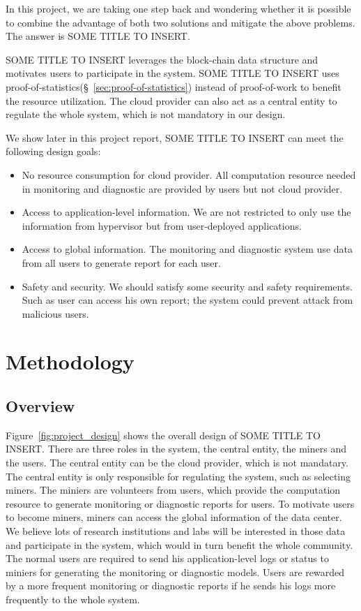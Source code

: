 \documentclass{article}
\newcommand{\projTitle}{SOME TITLE TO INSERT\xspace}
\begin{document}
In this project, we are taking one step back and wondering whether it is possible to combine the advantage of both two solutions and mitigate the above problems. The answer is \projTitle.

\projTitle leverages the block-chain data structure and motivates users to participate in the system. \projTitle uses proof-of-statistics(\S~\ref{sec:proof-of-statistics}) instead of proof-of-work to benefit the resource utilization. The cloud provider can also act as a central entity to regulate the whole system, which is not mandatory in our design.

We show later in this project report, \projTitle can meet the following design goals:

\begin{itemize}
  \item No resource consumption for cloud provider. All computation resource needed in monitoring and diagnostic are provided by users but not cloud provider.
  \item Access to application-level information. We are not restricted to only use the information from hypervisor but from user-deployed applications.
  \item Access to global information. The monitoring and diagnostic system use data from all users to generate report for each user.
  \item Safety and security. We should satisfy some security and safety requirements. Such as user can access his own report; the system could prevent attack from malicious users.
\end{itemize}

\section{Methodology}
\subsection{Overview}
Figure~\ref{fig:project_design} shows the overall design of \projTitle. There are three roles in the system, the central entity, the miners and the users. The central entity can be the cloud provider, which is not mandatary. The central entity is only responsible for regulating the system, such as selecting miners. The miniers are volunteers from users, which provide the computation resource to generate monitoring or diagnostic reports for users. To motivate users to become miners, miners can access the global information of the data center. We believe lots of research institutions and labs will be interested in those data and participate in the system, which would in turn benefit the whole community. The normal users are required to send his application-level logs or status to miniers for generating the monitoring or diagnostic models. Users are rewarded by a more frequent monitoring or diagnostic reports if he sends his logs more frequently to the whole system. 
\end{document}
